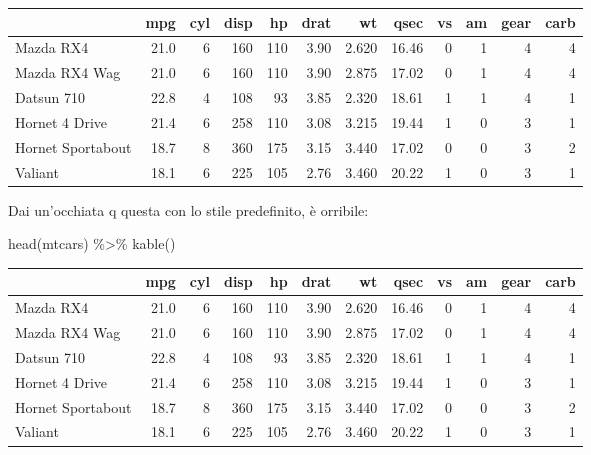 \documentclass[a4paper, 11pt, nobind]{templates/ociamthesis}
\newenvironment{Shaded}{\begin{snugshade}}{\end{snugshade}}
\newcommand{\FunctionTok}[1]{\textcolor[rgb]{0.00,0.00,0.00}{#1}}
\newcommand{\NormalTok}[1]{#1}
\newcommand{\SpecialCharTok}[1]{\textcolor[rgb]{0.00,0.00,0.00}{#1}}
\renewenvironment{Shaded}
{
  \vspace{10pt}%
  \begin{snugshade}%
}{%
  \end{snugshade}%
  \vspace{8pt}%
}
\begin{document}
\begin{tabular}{lrrrrrrrrrrr}
\toprule
  & mpg & cyl & disp & hp & drat & wt & qsec & vs & am & gear & carb\\
\midrule
Mazda RX4 & 21.0 & 6 & 160 & 110 & 3.90 & 2.620 & 16.46 & 0 & 1 & 4 & 4\\
Mazda RX4 Wag & 21.0 & 6 & 160 & 110 & 3.90 & 2.875 & 17.02 & 0 & 1 & 4 & 4\\
Datsun 710 & 22.8 & 4 & 108 & 93 & 3.85 & 2.320 & 18.61 & 1 & 1 & 4 & 1\\
Hornet 4 Drive & 21.4 & 6 & 258 & 110 & 3.08 & 3.215 & 19.44 & 1 & 0 & 3 & 1\\
Hornet Sportabout & 18.7 & 8 & 360 & 175 & 3.15 & 3.440 & 17.02 & 0 & 0 & 3 & 2\\
\addlinespace
Valiant & 18.1 & 6 & 225 & 105 & 2.76 & 3.460 & 20.22 & 1 & 0 & 3 & 1\\
\bottomrule
\end{tabular}

\vspace{4mm}

Dai un'occhiata q questa con lo stile predefinito, è orribile:

\begin{Shaded}
\begin{Highlighting}[]
\FunctionTok{head}\NormalTok{(mtcars) }\SpecialCharTok{\%\textgreater{}\%} 
  \FunctionTok{kable}\NormalTok{()}
\end{Highlighting}
\end{Shaded}

\begin{tabular}{l|r|r|r|r|r|r|r|r|r|r|r}
\hline
  & mpg & cyl & disp & hp & drat & wt & qsec & vs & am & gear & carb\\
\hline
Mazda RX4 & 21.0 & 6 & 160 & 110 & 3.90 & 2.620 & 16.46 & 0 & 1 & 4 & 4\\
\hline
Mazda RX4 Wag & 21.0 & 6 & 160 & 110 & 3.90 & 2.875 & 17.02 & 0 & 1 & 4 & 4\\
\hline
Datsun 710 & 22.8 & 4 & 108 & 93 & 3.85 & 2.320 & 18.61 & 1 & 1 & 4 & 1\\
\hline
Hornet 4 Drive & 21.4 & 6 & 258 & 110 & 3.08 & 3.215 & 19.44 & 1 & 0 & 3 & 1\\
\hline
Hornet Sportabout & 18.7 & 8 & 360 & 175 & 3.15 & 3.440 & 17.02 & 0 & 0 & 3 & 2\\
\hline
Valiant & 18.1 & 6 & 225 & 105 & 2.76 & 3.460 & 20.22 & 1 & 0 & 3 & 1\\
\hline
\end{tabular}
\end{document}
